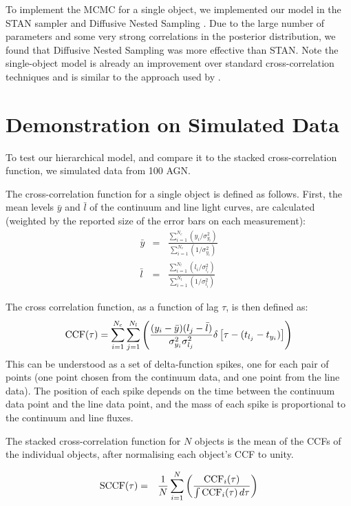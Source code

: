 \documentclass[useAMS,usenatbib]{mn2e}
\begin{document}
To implement the MCMC for a single object,
we implemented our model in the STAN sampler \citep{nuts}
and Diffusive Nested Sampling \citep{dnest}. Due to the large number of
parameters and some very strong correlations in the posterior distribution,
we found that Diffusive Nested Sampling was more effective than STAN.
Note the single-object model is already an improvement over standard
cross-correlation techniques and is similar to the approach used by
\citep{2011ApJ...735...80Z}.

\section{Demonstration on Simulated Data}
To test our hierarchical model, and compare it to the stacked cross-correlation
function, we simulated data from 100 AGN.

The cross-correlation function for a single object is defined as follows. First,
the mean levels $\bar{y}$ and $\bar{l}$ of the continuum and line light curves,
are calculated (weighted by the reported size of the error bars on each
measurement):
\begin{eqnarray}
\bar{y} &=& \frac{\sum_{i=1}^{N_c} \left(y_i/\sigma_{y_i}^2\right)}{\sum_{i=1}^{N_c} \left(1/\sigma_{y_i}^2\right)}\\
\bar{l} &=& \frac{\sum_{i=1}^{N_l} \left(l_i/\sigma_{l_i}^2\right)}{\sum_{i=1}^{N_l} \left(1/\sigma_{l_i}^2\right)}
\end{eqnarray}

The cross correlation function, as a function of lag $\tau$, is then defined as:
\begin{eqnarray}
\textnormal{CCF}(\tau) =
\sum_{i=1}^{N_c} \sum_{j=1}^{N_l}
\left(\frac{(y_i - \bar{y})(l_j - \bar{l})}{\sigma_{y_i}^2\sigma_{l_j}^2}
\delta\left[\tau - (t_{l_j} - t_{y_i})\right]\right)
\end{eqnarray}
This can be understood as a set of delta-function spikes, one for each pair
of points (one point chosen from the continuum data, and one point from the
line data). The position of each spike depends on the time between the continuum
data point and the line data point, and the mass of each spike is proportional
to the continuum and line fluxes.

The stacked cross-correlation function for $N$ objects is the mean of the CCFs
of the individual objects, after normalising each object's CCF to unity.

\begin{eqnarray}
\textnormal{SCCF}(\tau) &=&
\frac{1}{N} \sum_{i=1}^N
\left(
\frac{\textnormal{CCF}_i(\tau)}{\int \textnormal{CCF}_i(\tau) \, d\tau}
\right)
\end{eqnarray}
\end{document}
